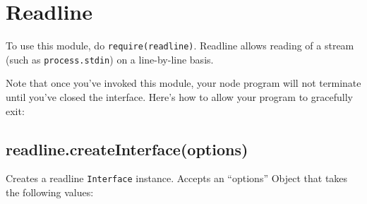 \section{Readline}\label{readline}

\begin{Shaded}
\begin{Highlighting}[]
 
\end{Highlighting}
\end{Shaded}

To use this module, do
\texttt{require(\textquotesingle{}readline\textquotesingle{})}. Readline
allows reading of a stream (such as \texttt{process.stdin}) on a
line-by-line basis.

Note that once you've invoked this module, your node program will not
terminate until you've closed the interface. Here's how to allow your
program to gracefully exit:

\begin{Shaded}
\begin{Highlighting}[]
 \NormalTok{(}\NormalTok{);}

 \NormalTok{(\{}
  \NormalTok{: }\NormalTok{,}
  \NormalTok{: }
\NormalTok{\});}

\NormalTok{(}\NormalTok{, }
  \NormalTok{(}

  \NormalTok{();}
\NormalTok{\});}
\end{Highlighting}
\end{Shaded}

\subsection{readline.createInterface(options)}\label{readline.createinterfaceoptions}

Creates a readline \texttt{Interface} instance. Accepts an ``options''
Object that takes the following values:

